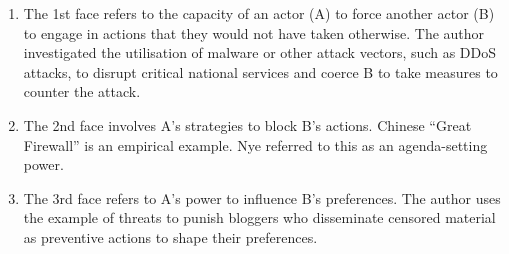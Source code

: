 \begin{enumerate}

   \item The 1st face refers to the capacity of an actor (A) to force another actor (B) to engage in actions that they would not have taken otherwise. The author investigated the utilisation of malware or other attack vectors, such as DDoS attacks, to disrupt critical national services and coerce B to take measures to counter the attack. 
   \item The 2nd face involves A’s strategies to block B’s actions. Chinese “Great Firewall” is an empirical example. Nye referred to this as an agenda-setting power.
   \item The 3rd face refers to A’s power to influence B’s preferences. The author uses the example of threats to punish bloggers who disseminate censored material as preventive actions to shape their preferences.
\end{enumerate}

